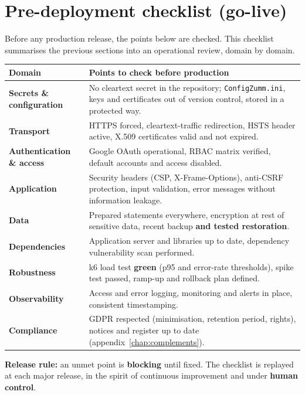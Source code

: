 \section{Pre-deployment checklist (go-live)}
Before any production release, the points below are checked. This checklist
summarises the previous sections into an operational review, domain by domain.
\begin{xltabular}{\textwidth}{>{\bfseries}p{3.4cm} X}
\toprule
\textbf{Domain} & \textbf{Points to check before production} \\
\midrule
\endhead
Secrets \& configuration & No cleartext secret in the repository; \texttt{ConfigZumm.ini}, keys and certificates out of version control, stored in a protected way. \\
Transport & HTTPS forced, cleartext-traffic redirection, HSTS header active, X.509 certificates valid and not expired. \\
Authentication \& access & Google OAuth operational, RBAC matrix verified, default accounts and access disabled. \\
Application & Security headers (CSP, X-Frame-Options), anti-CSRF protection, input validation, error messages without information leakage. \\
Data & Prepared statements everywhere, encryption at rest of sensitive data, recent backup \textbf{and tested restoration}. \\
Dependencies & Application server and libraries up to date, dependency vulnerability scan performed. \\
Robustness & k6 load test \textbf{green} (p95 and error-rate thresholds), spike test passed, ramp-up and rollback plan defined. \\
Observability & Access and error logging, monitoring and alerts in place, consistent timestamping. \\
Compliance & GDPR respected (minimisation, retention period, rights), notices and register up to date (appendix~\ref{chap:complements}). \\
\bottomrule
\end{xltabular}

\begin{encadre}
\textbf{Release rule:} an unmet point is \textbf{blocking} until fixed. The
checklist is replayed at each major release, in the spirit of continuous
improvement and under \textbf{human control}.
\end{encadre}

